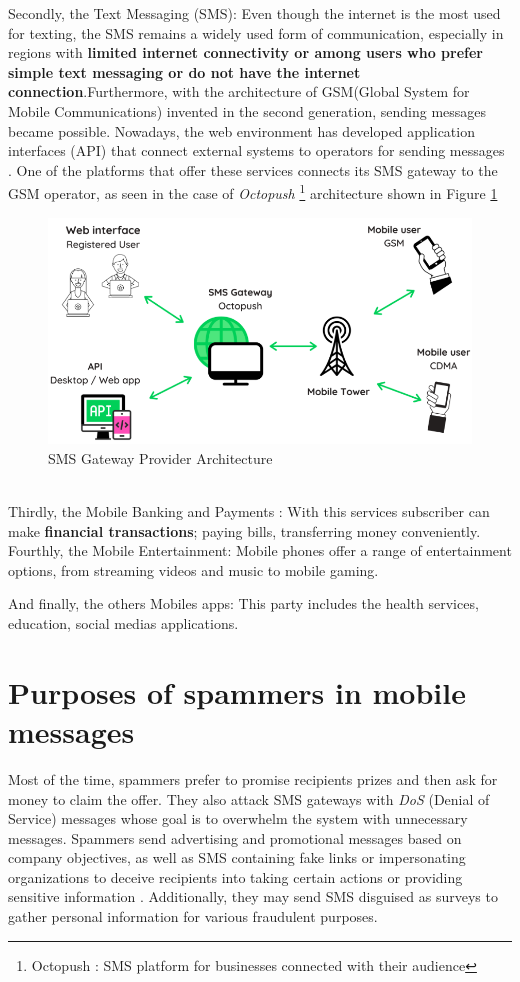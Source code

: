 \documentclass[12pt,a4paper, oneside]{book}
\begin{document}
Secondly, the Text Messaging (SMS): Even though the internet is the most used for texting, the SMS remains a widely used form of communication, especially in regions with \textbf{limited internet connectivity or among users who prefer simple text messaging or do not have the internet connection}.Furthermore, with the architecture of GSM(Global System for Mobile Communications) invented in the second generation, sending messages became possible. Nowadays, the web environment has developed application interfaces (API) that connect external systems to operators for sending messages \cite{hassinen2003secure}. One of the platforms that offer these services connects its SMS gateway to the GSM operator, as seen in the case of \textit{Octopush} \footnote{Octopush : SMS platform for businesses connected with their audience} architecture shown in Figure \ref{fig:smsgateway}  
\begin{figure}[h]
	\centering
	\includegraphics[width=1\linewidth]{Images/SMSgateway}
	\caption{SMS Gateway Provider Architecture}
	\label{fig:smsgateway} 
\end{figure}
 \\
 
Thirdly, the Mobile Banking and Payments : With this services subscriber can make \textbf{financial transactions}; paying bills, transferring money conveniently. \\

Fourthly, the Mobile Entertainment: Mobile phones offer a range of entertainment options, from streaming videos and music to mobile gaming. 

And finally, the others Mobiles apps: This party includes the health services, education, social medias applications.
\section{Purposes of spammers in mobile messages}
Most of the time, spammers prefer to promise recipients prizes and then ask for money to claim the offer. They also attack SMS gateways with \textit{DoS} (Denial of Service) messages \cite{androulidakis2013fimess} whose goal is to overwhelm the system with unnecessary messages. Spammers send advertising and promotional messages based on company objectives, as well as SMS containing fake links or impersonating organizations to deceive recipients into taking certain actions or providing sensitive information \cite{tang2022clues}. Additionally, they may send SMS disguised as surveys to gather personal information for various fraudulent purposes. 
\end{document}

